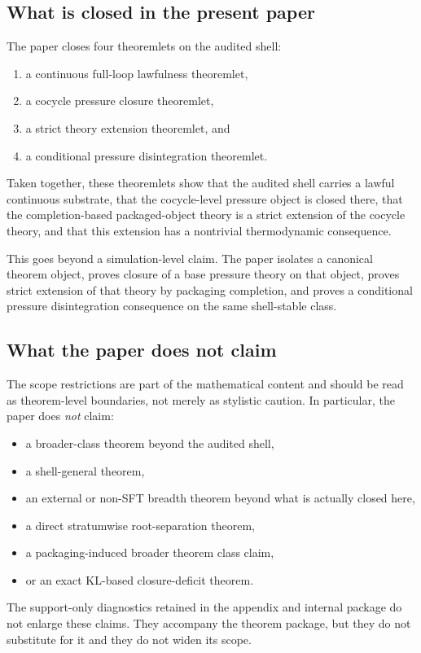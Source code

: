 \documentclass[11pt]{article}
\theoremstyle{definition}
\begin{document}
\subsection{What is closed in the present paper}

The paper closes four theoremlets on the audited shell:
\begin{enumerate}
    \item a continuous full-loop lawfulness theoremlet,
    \item a cocycle pressure closure theoremlet,
    \item a strict theory extension theoremlet, and
    \item a conditional pressure disintegration theoremlet.
\end{enumerate}
Taken together, these theoremlets show that the audited shell carries a lawful continuous substrate, that the cocycle-level pressure object is closed there, that the completion-based packaged-object theory is a strict extension of the cocycle theory, and that this extension has a nontrivial thermodynamic consequence.

This goes beyond a simulation-level claim. The paper isolates a canonical theorem object, proves closure of a base pressure theory on that object, proves strict extension of that theory by packaging completion, and proves a conditional pressure disintegration consequence on the same shell-stable class.

\subsection{What the paper does not claim}

The scope restrictions are part of the mathematical content and should be read as theorem-level boundaries, not merely as stylistic caution. In particular, the paper does \emph{not} claim:
\begin{itemize}
    \item a broader-class theorem beyond the audited shell,
    \item a shell-general theorem,
    \item an external or non-SFT breadth theorem beyond what is actually closed here,
    \item a direct stratumwise root-separation theorem,
    \item a packaging-induced broader theorem class claim,
    \item or an exact KL-based closure-deficit theorem.
\end{itemize}
The support-only diagnostics retained in the appendix and internal package do not enlarge these claims. They accompany the theorem package, but they do not substitute for it and they do not widen its scope.
\end{document}
